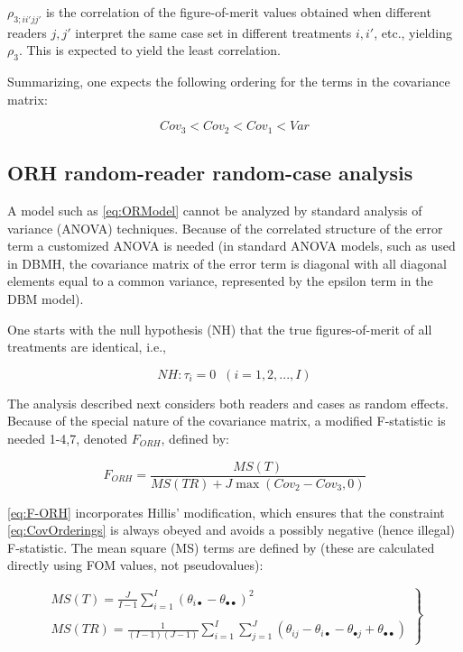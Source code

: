 \documentclass[
]{book}
\begin{document}
\(\rho_{3;ii'jj'}\) is the correlation of the figure-of-merit values obtained when different readers \(j,j'\) interpret the same case set in different treatments \(i,i'\), etc., yielding \(\rho_3\). This is expected to yield the least correlation.

Summarizing, one expects the following ordering for the terms in the covariance matrix:

\begin{equation}
Cov_3 < Cov_2 < Cov_1 < Var
\label{eq:CovOrderings}
\end{equation}

\hypertarget{orh-random-reader-random-case-analysis}{%
\subsection{ORH random-reader random-case analysis}\label{orh-random-reader-random-case-analysis}}

A model such as \eqref{eq:ORModel} cannot be analyzed by standard analysis of variance (ANOVA) techniques. Because of the correlated structure of the error term a customized ANOVA is needed (in standard ANOVA models, such as used in DBMH, the covariance matrix of the error term is diagonal with all diagonal elements equal to a common variance, represented by the epsilon term in the DBM model).

One starts with the null hypothesis (NH) that the true figures-of-merit of all treatments are identical, i.e.,

\begin{equation}
NH:\tau_i=0\;\; (i=1,2,...,I)
\label{eq:ORModelNH}
\end{equation}

The analysis described next considers both readers and cases as random effects. Because of the special nature of the covariance matrix, a modified F-statistic is needed 1-4,7, denoted \(F_{ORH}\), defined by:

\begin{equation}
F_{ORH}=\frac{MS(T)}{MS(TR)+J\max(Cov_2-Cov_3,0)}
\label{eq:F-ORH}
\end{equation}

\eqref{eq:F-ORH} incorporates Hillis' modification, which ensures that the constraint \eqref{eq:CovOrderings} is always obeyed and avoids a possibly negative (hence illegal) F-statistic. The mean square (MS) terms are defined by (these are calculated directly using FOM values, not pseudovalues):

\begin{equation}
\left.\begin{matrix}
MS(T)=\frac{J}{I-1}\sum_{i=1}^{I}(\theta_{i\bullet}-\theta_{\bullet\bullet})^2\\
\\ 
MS(TR)=\frac{1}{(I-1)(J-1)}\sum_{i=1}^{I}\sum_{j=1}^{J}(\theta_{ij}-\theta_{i\bullet}-\theta_{\bullet j}+\theta_{\bullet\bullet})
\end{matrix}\right\}
\label{eq:MS-ORH}
\end{equation}
\end{document}
